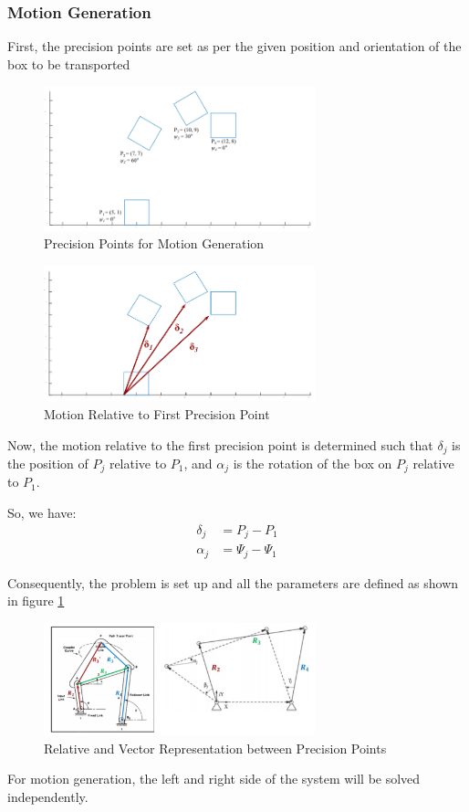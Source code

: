 \documentclass[12pt]{article}
\begin{document}
\subsubsection{Motion Generation}
First, the precision points are set as per the given position and orientation of the box to be transported
\begin{figure}[h!]
    \centering
    \includegraphics[width=0.7\textwidth]{MG_1.png}
    \caption{Precision Points for Motion Generation}
\end{figure}
\begin{figure}[h!]
    \centering
    \includegraphics[width=0.7\textwidth]{MG_2.png}
    \caption{Motion Relative to First Precision Point}
\end{figure}
Now, the motion relative to the first precision point is determined such that $\delta_j$ is the position of $P_j$ relative to $P_1$, and $\alpha_j$ is the rotation of the box on $P_j$ relative to $P_1$. 

So, we have:
\begin{align}
    \delta_j&=P_j-P_1\\
    \alpha_j&=\Psi_j-\Psi_1
\end{align}

Consequently, the problem is set up and all the parameters are defined as shown in figure \ref{fig:MG_3}

\begin{figure}[h!]
    \centering
    \includegraphics[width=0.7\textwidth]{MG_3.png}
    \caption{Relative and Vector Representation between Precision Points}
    \label{fig:MG_3}
\end{figure}
For motion generation, the left and right side of the system will be solved independently.
\end{document}
